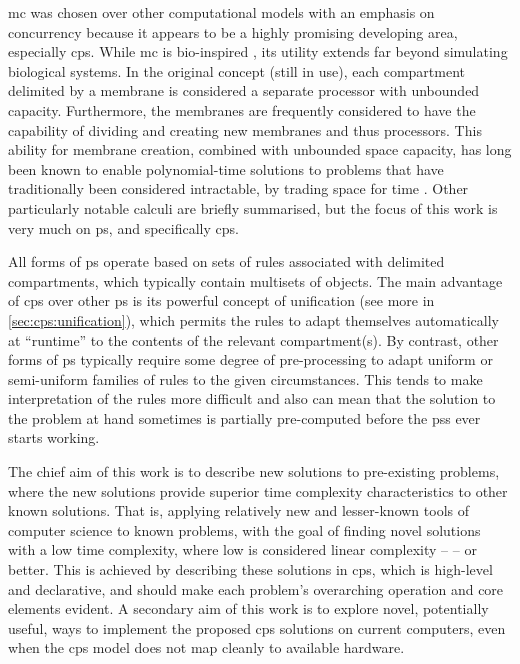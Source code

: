 \Gls{mc} was chosen over other computational models with an emphasis on concurrency because it appears to be a highly promising developing area, especially \gls{cps}.  While \gls{mc} is bio-inspired \cite{Paun2000}, its utility extends far beyond simulating biological systems.  In the original concept (still in use), each \gls{compartment} delimited by a membrane is considered a separate processor with unbounded capacity.  Furthermore, the membranes are frequently considered to have the capability of dividing and creating new membranes and thus processors.  This ability for membrane creation, combined with unbounded space capacity, has long been known to enable polynomial-time solutions to problems that have traditionally been considered intractable, by trading space for time \cite{Paun1999a,Sosik2003}.
Other particularly notable calculi are briefly summarised, but the focus of this work is very much on \gls{ps}, and specifically \gls{cps}.

All forms of \gls{ps} operate based on sets of rules associated with delimited \glspl{compartment}, which typically contain multisets of objects. The main advantage of \gls{cps} over other \gls{ps} is its powerful concept of unification (see more in \vref{sec:cps:unification}), which permits the rules to adapt themselves automatically at ``runtime'' to the contents of the relevant \gls{compartment}(s).  By contrast, other forms of \gls{ps} typically require some degree of pre-processing to adapt uniform or semi-uniform families of rules to the given circumstances.  This tends to make interpretation of the rules more difficult and also can mean that the solution to the problem at hand sometimes is partially pre-computed before the \glspl{ps} ever starts working.

The chief aim of this work is to describe new solutions to pre-existing problems, where the new solutions provide superior time complexity characteristics to other known solutions.  That is, applying relatively new and lesser-known tools of computer science to known problems, with the goal of finding novel solutions with a low time complexity, where low is considered linear complexity --  -- or better.  
This is achieved by describing these solutions in \gls{cps}, which is high-level and declarative, and should make each problem's overarching operation and core elements evident.
A secondary aim of this work is to explore novel, potentially useful, ways to implement the proposed \gls{cps} solutions on current computers, even when the \gls{cps} model does not map cleanly to available hardware.  


